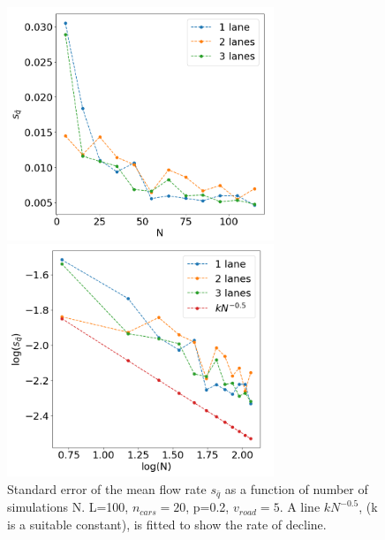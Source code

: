 \documentclass[a4paper,12pt]{article}
\begin{document}
\begin{figure}[H]
	 \centering
    \begin{minipage}{.5\textwidth}
        \centering
        \includegraphics[width=8cm]{fig6.png}
    \end{minipage}%
    \begin{minipage}{.5\textwidth}
        \centering
        \includegraphics[width=8cm]{fig7.png}
    \end{minipage}
    \caption{Standard error of the mean flow rate $s_{\bar{q}}$ as a function of number of simulations N. L=100, $n_{cars}=20$, p=0.2, $v_{road}=5$. A line $kN^{-0.5}$, (k is a suitable constant), is fitted to show the rate of decline.}
    \label{semq}
\end{figure}
\end{document}
